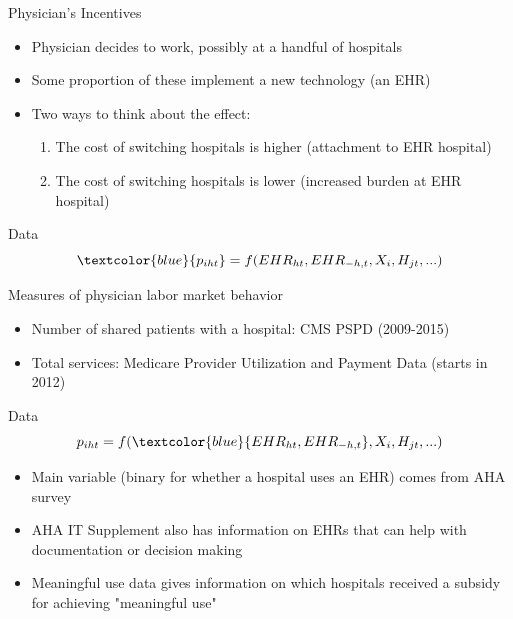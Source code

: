 \documentclass[10pt]{beamer}
\begin{document}
\begin{frame}{Physician's Incentives}
\begin{itemize}
    \item Physician decides to work, possibly at a handful of hospitals
    \item Some proportion of these implement a new technology (an EHR)
    \item Two ways to think about the effect:
    \begin{enumerate}
        \item The cost of switching hospitals is higher (attachment to EHR hospital)
        \item The cost of switching hospitals is lower (increased burden at EHR hospital)
    \end{enumerate}
\end{itemize}
\end{frame}


\begin{frame}{Data}
\begin{equation*}
    \textcolor{blue}{p_{iht}}=f(EHR_{ht},EHR_{-h,t},X_i,H_{jt},...)
\end{equation*}

\vspace{3mm}

Measures of physician labor market behavior
\begin{itemize}
    \item Number of shared patients with a hospital: CMS PSPD (2009-2015)
    \item Total services: Medicare Provider Utilization and Payment Data (starts in 2012)
\end{itemize}
\end{frame}

\begin{frame}[noframenumbering]{Data}
\begin{equation*}
    p_{iht}=f(\textcolor{blue}{EHR_{ht},EHR_{-h,t}},X_i,H_{jt},...)
\end{equation*}

\vspace{5mm}

\begin{itemize}
    \item Main variable (binary for whether a hospital uses an EHR) comes from AHA survey
    \item AHA IT Supplement also has information on EHRs that can help with documentation or decision making
    \item Meaningful use data gives information on which hospitals received a subsidy for achieving "meaningful use"
\end{itemize}
\end{frame}
\end{document}
